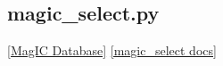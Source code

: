 \documentclass[11pt]{book}
\begin{document}
{{%
%
%
%
%
%
%
%
%
%


%

\subsection{magic\_select.py}
\href{#MagICDatabase}{[MagIC Database]}
\href{https://github.com/PmagPy/PmagPy/blob/master/programs/magic_select.py}{[magic\_select docs]}


}}
\end{document}
